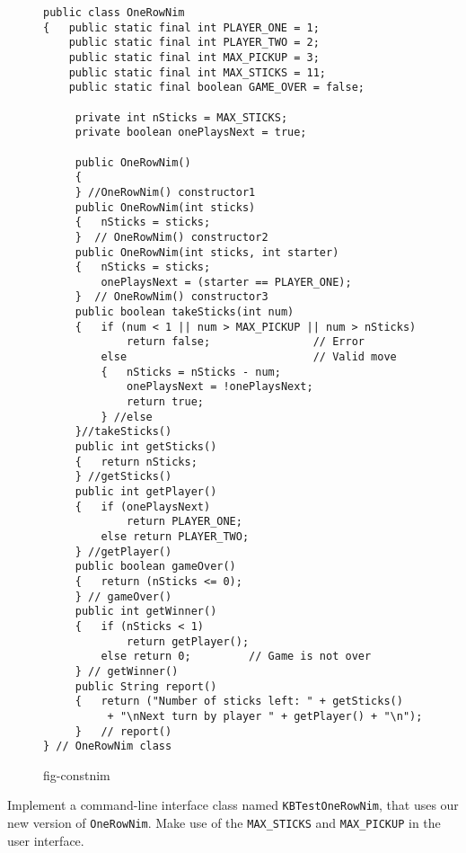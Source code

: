 \begin{figure}[p]
\jjjprogstart
\begin{jjjlisting}
\begin{lstlisting}
public class OneRowNim
{   public static final int PLAYER_ONE = 1;
    public static final int PLAYER_TWO = 2;
    public static final int MAX_PICKUP = 3;
    public static final int MAX_STICKS = 11;
    public static final boolean GAME_OVER = false;

     private int nSticks = MAX_STICKS;
     private boolean onePlaysNext = true;

     public OneRowNim()
     {
     } //OneRowNim() constructor1
     public OneRowNim(int sticks)
     {   nSticks = sticks;
     }  // OneRowNim() constructor2
     public OneRowNim(int sticks, int starter)
     {   nSticks = sticks;
         onePlaysNext = (starter == PLAYER_ONE);
     }  // OneRowNim() constructor3
     public boolean takeSticks(int num)
     {   if (num < 1 || num > MAX_PICKUP || num > nSticks) 
             return false;                // Error
         else                             // Valid move
         {   nSticks = nSticks - num;
             onePlaysNext = !onePlaysNext;
             return true;
         } //else
     }//takeSticks()
     public int getSticks()
     {   return nSticks;
     } //getSticks()
     public int getPlayer()
     {   if (onePlaysNext) 
             return PLAYER_ONE;
         else return PLAYER_TWO;
     } //getPlayer()
     public boolean gameOver()
     {   return (nSticks <= 0);
     } // gameOver()
     public int getWinner()
     {   if (nSticks < 1) 
             return getPlayer();
         else return 0;         // Game is not over
     } // getWinner()
     public String report()
     {   return ("Number of sticks left: " + getSticks()
          + "\nNext turn by player " + getPlayer() + "\n");
     }   // report()
} // OneRowNim class
\end{lstlisting}
\end{jjjlisting}
{fig-constnim}
\end{figure}

\label{self-study-exercise}
\begin{SSTUDY}

\item  Implement a command-line interface class named
{\tt KBTestOneRowNim}, that uses our new version of {\tt OneRowNim}.
Make use of the {\tt MAX\_STICKS} and {\tt MAX\_PICKUP} in the user
interface.  

\end{SSTUDY}

